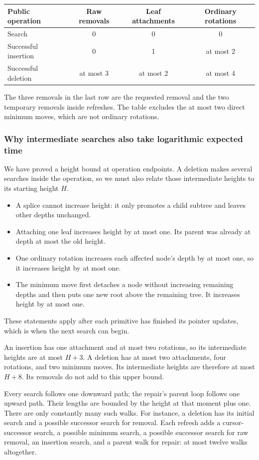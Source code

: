 \documentclass[11pt,a4paper]{article}
\theoremstyle{readable}
\begin{document}
\begin{center}
\begin{tabular}{lccc}
\toprule
Public operation & Raw removals & Leaf attachments & Ordinary rotations \\
\midrule
Search & 0 & 0 & 0 \\
Successful insertion & 0 & 1 & at most 2 \\
Successful deletion & at most 3 & at most 2 & at most 4 \\
\bottomrule
\end{tabular}
\end{center}
The three removals in the last row are the requested removal and
the two temporary removals inside refreshes. The table excludes the
at most two direct minimum moves, which are not ordinary rotations.

\subsubsection*{Why intermediate searches also take logarithmic expected time}
We have proved a height bound at operation endpoints. A deletion makes
several searches inside the operation, so we must also relate those
intermediate heights to its starting height $H$.
\begin{itemize}
  \item A splice cannot increase height: it only promotes a child
        subtree and leaves other depths unchanged.
  \item Attaching one leaf increases height by at most one. Its
        parent was already at depth at most the old height.
  \item One ordinary rotation increases each affected node's depth
        by at most one, so it increases height by at most one.
  \item The minimum move first detaches a node without increasing
        remaining depths and then puts one new root above the
        remaining tree. It increases height by at most one.
\end{itemize}
These statements apply after each primitive has finished its pointer
updates, which is when the next search can begin.

An insertion has one attachment and at most two rotations, so its
intermediate heights are at most $H+3$. A deletion has at most two
attachments, four rotations, and two minimum moves. Its intermediate
heights are therefore at most $H+8$. Its removals do not add to this
upper bound.

Every search follows one downward path; the repair's parent loop
follows one upward path. Their lengths are bounded by the height
at that moment plus one. There are only constantly many such walks.
For instance, a deletion has its initial search and a possible
successor search for removal. Each refresh adds a cursor-successor
search, a possible minimum search, a possible successor search for
raw removal, an insertion search, and a parent walk for repair:
at most twelve walks altogether.
\end{document}
